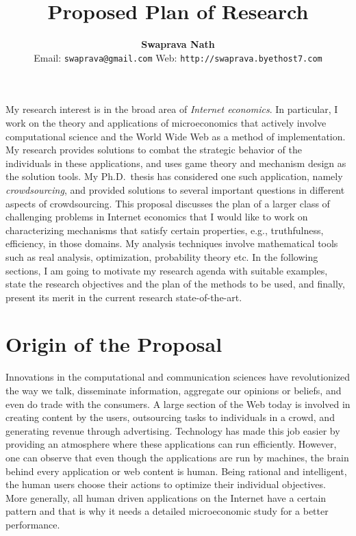 \documentclass[10pt,psfig,letter]{article}
\title{\vspace{-0.5in}\sc Proposed Plan of Research\vspace{-2mm}}
\author{{\bf Swaprava Nath} 
	\\ \small{Email: \texttt{swaprava@gmail.com} \hspace{1cm} Web: \texttt{http://swaprava.byethost7.com}}
}
\date{}
\begin{document}
\maketitle

\vspace{-0.25in}

\noindent
My research interest is in the broad area of {\em Internet economics}. In particular, I work on the theory and applications of microeconomics that actively involve computational science and the World Wide Web as a method of implementation. My research provides solutions to combat the strategic behavior of the individuals in these applications, and uses game theory and mechanism design as the solution tools. My Ph.D.\ thesis has considered one such application, namely {\em crowdsourcing}, and provided solutions to several important questions in different aspects of crowdsourcing. This proposal discusses the plan of a larger class of challenging problems in Internet economics that I would like to work on characterizing mechanisms that satisfy certain properties, e.g., truthfulness, efficiency, in those domains. My analysis techniques involve mathematical tools such as real analysis, optimization, probability theory etc. In the following sections, I am going to motivate my research agenda with suitable examples, state the research objectives and the plan of the methods to be used, and finally, present its 
merit in the current research state-of-the-art.

% 

\section{Origin of the Proposal}

Innovations in the computational and communication sciences have revolutionized the way we talk, disseminate information, aggregate our opinions or beliefs, and even do trade with the consumers. A large section of the Web today is involved in creating content by the users, outsourcing tasks to individuals in a crowd, and generating revenue through advertising. Technology has made this job easier by providing an atmosphere where these applications can run efficiently. However, one can observe that even though the applications are run by machines, the brain behind every application or web content is human. Being rational and intelligent, the human users choose their actions to optimize their individual objectives. More generally, all human driven applications on the Internet have a certain pattern and that is why it needs a detailed microeconomic study for a better performance.
\end{document}
